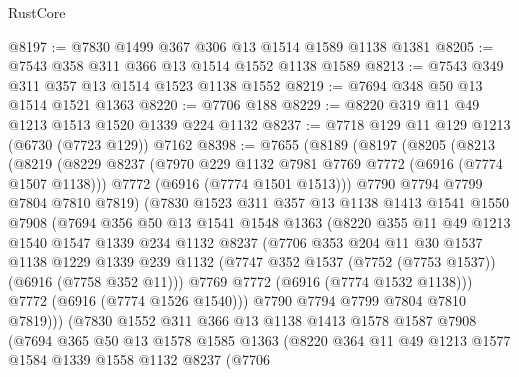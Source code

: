 \begin{lexlean}{RustCore}
\begin{coremodule}
@8197 := @7830 @1499 @367 @306 @13 @1514 @1589 @1138 @1381
@8205 := @7543 @358 @311 @366 @13 @1514 @1552 @1138 @1589
@8213 := @7543 @349 @311 @357 @13 @1514 @1523 @1138 @1552
@8219 := @7694 @348 @50 @13 @1514 @1521 @1363
@8220 := @7706 @188
@8229 := @8220 @319 @11 @49 @1213 @1513 @1520 @1339 @224 @1132
@8237 := @7718 @129 @11 @129 @1213 (@6730 (@7723 @129)) @7162
@8398 := @7655
    (@8189
      (@8197
        (@8205
          (@8213
            (@8219
              (@8229
                @8237
                (@7970 @229 @1132 @7981 @7769 @7772 (@6916 (@7774 @1507 @1138)))
                @7772
                (@6916 (@7774 @1501 @1513)))
              @7790
              @7794
              @7799
              @7804
              @7810
              @7819)
            (@7830
              @1523
              @311
              @357
              @13
              @1138
              @1413
              @1541
              @1550
              @7908
              (@7694
                @356
                @50
                @13
                @1541
                @1548
                @1363
                (@8220
                  @355
                  @11
                  @49
                  @1213
                  @1540
                  @1547
                  @1339
                  @234
                  @1132
                  @8237
                  (@7706
                    @353
                    @204
                    @11
                    @30
                    @1537
                    @1138
                    @1229
                    @1339
                    @239
                    @1132
                    (@7747 @352 @1537 (@7752 (@7753 @1537)) (@6916 (@7758 @352 @11)))
                    @7769
                    @7772
                    (@6916 (@7774 @1532 @1138)))
                  @7772
                  (@6916 (@7774 @1526 @1540)))
                @7790
                @7794
                @7799
                @7804
                @7810
                @7819)))
          (@7830
            @1552
            @311
            @366
            @13
            @1138
            @1413
            @1578
            @1587
            @7908
            (@7694
              @365
              @50
              @13
              @1578
              @1585
              @1363
              (@8220
                @364
                @11
                @49
                @1213
                @1577
                @1584
                @1339
                @1558
                @1132
                @8237
                (@7706

\end{coremodule}
\end{lexlean}

